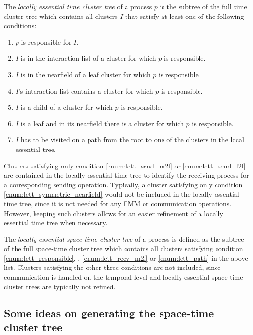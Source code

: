\documentclass[a4paper,11pt]{article}
\theoremstyle{plain}
\theoremstyle{definition}
\theoremstyle{remark}
\begin{document}
The \textit{locally essential time cluster tree} of a process $p$ is the subtree of the full time cluster tree which contains all clusters $I$ that satisfy at least one of the following conditions:
\begin{enumerate}
  \item $p$ is responsible for $I$. \label{enum:lett_responsible}
  \item $I$ is in the interaction list of a cluster for which $p$ is responsible. \label{enum:lett_recv_m2l}
  \item $I$ is in the nearfield of a leaf cluster for which $p$ is responsible. \label{enum:lett_nearfield_of_leaf}
  \item $I$'s interaction list contains a cluster for which $p$ is responsible. \label{enum:lett_send_m2l}
  \item $I$ is a child of a cluster for which $p$ is responsible. \label{enum:lett_send_l2l}
  \item $I$ is a leaf and in its nearfield there is a cluster for which $p$ is responsible.\label{enum:lett_symmetric_nearfield} 
  \item $I$ has to be visited on a path from the root to one of the clusters in the local essential tree. 
  \label{enum:lett_path}
\end{enumerate}
Clusters satisfying only condition \ref{enum:lett_send_m2l} or \ref{enum:lett_send_l2l} are contained in the locally essential time tree to identify the receiving process for a corresponding sending operation. Typically, a cluster satisfying only condition \ref{enum:lett_symmetric_nearfield} would not be included in the locally essential time tree, since it is not needed for any FMM or communication operations. However, keeping such clusters allows for an easier refinement of a locally essential time tree when necessary.

The \textit{locally essential space-time cluster tree} of a process is defined as the subtree of the full space-time cluster tree which contains all clusters satisfying condition \ref{enum:lett_responsible}, \label{enum:lett_nearfield_of_leaf}, \ref{enum:lett_recv_m2l} or \ref{enum:lett_path} in the above list. Clusters satisfying the other three conditions are not included, since communication is handled on the temporal level and locally essential space-time cluster trees are typically not refined.

\subsection{Some ideas on generating the space-time cluster tree} \label{sec:generation_spacetime_ct}
\end{document}
